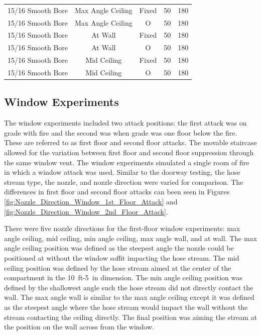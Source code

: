 \documentclass[12pt,oneside]{book}
\begin{document}
\begin{table}[!ht]
\begin{tabular}{ccccc}
15/16 Smooth Bore & Max Angle Ceiling   & Fixed   & 50 & 180 \\
15/16 Smooth Bore & Max Angle Ceiling   & O & 50  & 180 \\
15/16 Smooth Bore & At Wall     		& Fixed   & 50 & 180 \\
15/16 Smooth Bore & At Wall     		& O & 50  & 180 \\
15/16 Smooth Bore & Mid Ceiling 		& Fixed   & 50 & 180 \\
15/16 Smooth Bore & Mid Ceiling 		& O & 50  & 180 \\
\bottomrule[1.25pt]
\end{tabular}
\end{table}

\clearpage

\subsection{Window Experiments}
\label{ext_tests}

The window experiments included two attack positions: the first attack was on grade with fire and the second was when grade was one floor below the fire. These are referred to as first floor and second floor attacks. The movable staircase allowed for the variation between first floor and second floor suppression through the same window vent. The window experiments simulated a single room of fire in which a window attack was used. Similar to the doorway testing, the hose stream type, the nozzle, and nozzle direction were varied for comparison. The differences in first floor and second floor attacks can been seen in Figures \ref{fig:Nozzle_Direction_Window_1st_Floor_Attack} and \ref{fig:Nozzle_Direction_Window_2nd_Floor_Attack}. 

There were five nozzle directions for the first-floor window experiments: max angle ceiling, mid ceiling, min angle ceiling, max angle wall, and at wall. The max angle ceiling position was defined as the steepest angle the nozzle could be positioned at without the window soffit impacting the hose stream. The mid ceiling position was defined by the hose stream aimed at the center of the compartment in the 10~ft-5~in dimension. The min angle ceiling position was defined by the shallowest angle such the hose stream did not directly contact the wall. The max angle wall is similar to the max angle ceiling except it was defined as the steepest angle where the hose stream would impact the wall without the stream contacting the ceiling directly. The final position was aiming the stream at the position on the wall across from the window.
\end{document}
